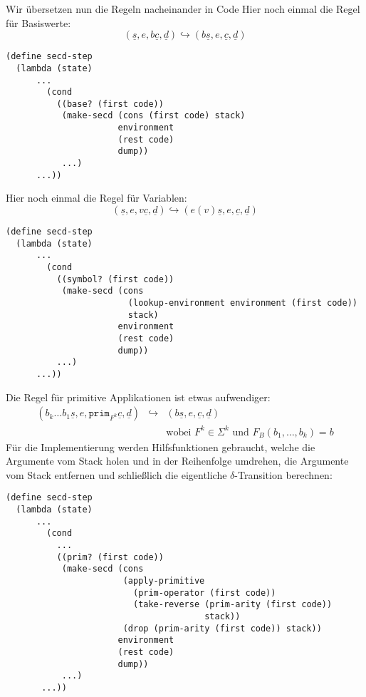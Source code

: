 %
Wir übersetzen nun die Regeln nacheinander in Code  Hier 
noch einmal die Regel für Basiswerte:
%
\begin{displaymath}
  (\underline{s}, e, b\underline{c}, \underline{d})
  \hookrightarrow
  (b\underline{s}, e, \underline{c}, \underline{d})
\end{displaymath}\vspace*{-5ex}
%
\begin{lstlisting}
(define secd-step
  (lambda (state)
      ...
        (cond
          ((base? (first code))
           (make-secd (cons (first code) stack)
                      environment
                      (rest code)
                      dump))
           ...)
      ...))
\end{lstlisting}
%
Hier noch einmal die Regel für Variablen:
%
\begin{displaymath}
  (\underline{s}, e, v\underline{c}, \underline{d})
  \hookrightarrow
  (e(v)\underline{s}, e, \underline{c}, \underline{d})
\end{displaymath}\vspace*{-5ex}
%
\begin{lstlisting}
(define secd-step
  (lambda (state)
      ...
        (cond
          ((symbol? (first code))
           (make-secd (cons
                        (lookup-environment environment (first code))
                        stack)
                      environment
                      (rest code)
                      dump))
          ...)
      ...))
\end{lstlisting}
%
Die Regel für primitive Applikationen ist etwas aufwendiger:
%
\begin{eqnarray*}
  (b_k\ldots b_1 \underline{s}, e, \mathtt{prim}_{F^k}\underline{c}, \underline{d})
  &\hookrightarrow&
  (b\underline{s}, e, \underline{c}, \underline{d})
  \\ && \textrm{wobei $F^k\in\Sigma^k$ und $F_B(b_1,\ldots,b_k) = b$}
\end{eqnarray*}
%
Für die Implementierung werden Hilfsfunktionen gebraucht, welche die
Argumente vom Stack holen und in der Reihenfolge umdrehen, die
Argumente vom Stack entfernen und schließlich die eigentliche
$\delta$-Transition berechnen:
%
\begin{lstlisting}
(define secd-step
  (lambda (state)
      ...
        (cond
          ...
          ((prim? (first code))
           (make-secd (cons
                       (apply-primitive
                         (prim-operator (first code))
                         (take-reverse (prim-arity (first code)) 
                                       stack))
                       (drop (prim-arity (first code)) stack))
                      environment
                      (rest code)
                      dump))
           ...)
       ...))
\end{lstlisting}
